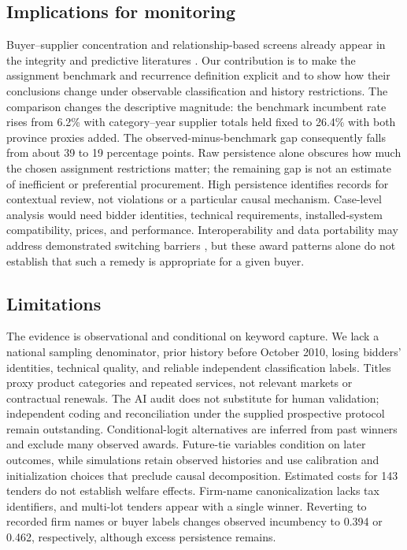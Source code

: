 \documentclass[pdflatex,sn-apa]{sn-jnl}
\begin{document}
\subsection{Implications for monitoring}
Buyer--supplier concentration and relationship-based screens already appear in the integrity and predictive literatures \citep{FazekasKocsis2020,Fazekas2024GlobalPP,FountoukidisPredictability2026}. Our contribution is to make the assignment benchmark and recurrence definition explicit and to show how their conclusions change under observable classification and history restrictions. The comparison changes the descriptive magnitude: the benchmark incumbent rate rises from 6.2\% with category--year supplier totals held fixed to 26.4\% with both province proxies added. The observed-minus-benchmark gap consequently falls from about 39 to 19 percentage points. Raw persistence alone obscures how much the chosen assignment restrictions matter; the remaining gap is not an estimate of inefficient or preferential procurement. High persistence identifies records for contextual review, not violations or a particular causal mechanism. Case-level analysis would need bidder identities, technical requirements, installed-system compatibility, prices, and performance. Interoperability and data portability may address demonstrated switching barriers \citep{EC2013AgainstLockin}, but these award patterns alone do not establish that such a remedy is appropriate for a given buyer.

\subsection{Limitations}
The evidence is observational and conditional on keyword capture. We lack a national sampling denominator, prior history before October 2010, losing bidders' identities, technical quality, and reliable independent classification labels. Titles proxy product categories and repeated services, not relevant markets or contractual renewals. The AI audit does not substitute for human validation; independent coding and reconciliation under the supplied prospective protocol remain outstanding. Conditional-logit alternatives are inferred from past winners and exclude many observed awards. Future-tie variables condition on later outcomes, while simulations retain observed histories and use calibration and initialization choices that preclude causal decomposition. Estimated costs for 143 tenders do not establish welfare effects. Firm-name canonicalization lacks tax identifiers, and multi-lot tenders appear with a single winner. Reverting to recorded firm names or buyer labels changes observed incumbency to 0.394 or 0.462, respectively, although excess persistence remains.
\end{document}
